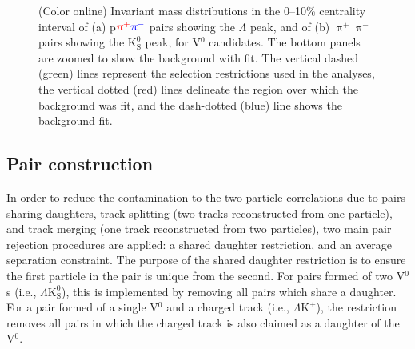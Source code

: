 \documentclass[ALICE,manyauthors]{cernphprep}
\newcommand{\Lam}{$\Lambda$\xspace}
\newcommand{\Ks}{$\mathrm{K^{0}_{S}}$\xspace}
\newcommand{\LamKpm}{$\Lambda\mathrm{K^{\pm}}$\xspace}
\newcommand{\LamKs}{$\Lambda\mathrm{K^{0}_{S}}$\xspace}
\newcommand{\Vz}{V$^{0}$\xspace}
\begin{document}
\begin{figure}[htp]
  \centering
  \caption{
  (Color online) Invariant mass distributions in the 0--10\% centrality interval of (a) p${\color{red}\uppi^{+}}{\color{blue}\uppi^{-}}$ pairs showing the \Lam peak, and of (b) $\uppi^{+}\uppi^{-}$ pairs showing the \Ks peak, for \Vz candidates.  
  The bottom panels are zoomed to show the background with fit.  
  The vertical dashed (green) lines represent the selection restrictions used in the analyses, the vertical dotted (red) lines delineate the region over which the background was fit, and the dash-dotted (blue) line shows the background fit.
  }  
  \label{fig:Purity}
\end{figure}





\subsection{Pair construction}
\label{PairConstruction}

In order to reduce the contamination to the two-particle correlations due to pairs sharing daughters, track splitting (two tracks reconstructed from one particle), and track merging (one track reconstructed from two particles), two main pair rejection procedures are applied: a shared daughter restriction, and an average separation constraint.
The purpose of the shared daughter restriction is to ensure the first particle in the pair is unique from the second.  
For pairs formed of two V$^{0}$s (i.e., \LamKs), this is implemented by removing all pairs which share a daughter.  
For a pair formed of a single \Vz and a charged track (i.e., \LamKpm), the restriction removes all pairs in which the charged track is also claimed as a daughter of the \Vz.  
\end{document}
